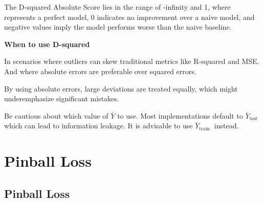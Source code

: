 \begin{center}
\end{center}

The D-squared Absolute Score lies in the range of -infinity and 1, where represents a perfect model, 0 indicates no improvement over a naive model,
and negative values imply the model performs worse than the naive baseline.

\textbf{When to use D-squared}

In scenarios where outliers can skew traditional metrics like R-squared and MSE. And where absolute errors are preferable over squared errors.

{
    \item By using absolute errors, large deviations are treated equally, which might underemphasize significant mistakes.
    \item Be cautious about which value of $\bar{Y}$ to use. Most implementations default to $\bar{Y}_{\text {test }}$ which can lead to information leakage. It is advisable to use $\bar{Y}_{\text {train }}$ instead.
}


\clearpage
\thispagestyle{regressionstyle}
\section{Pinball Loss}
\subsection{Pinball Loss }

